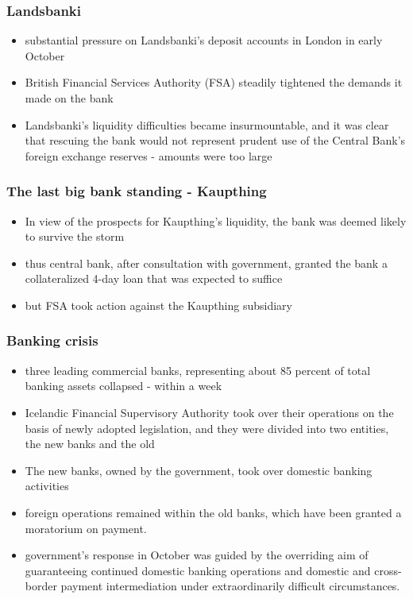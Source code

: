 \documentclass[11pt]{beamer}
\begin{document}
\begin{frame}
\frametitle{Landsbanki}
\begin{itemize}
\item  substantial pressure on Landsbanki’s deposit accounts in
London in early October
\item  British Financial Services Authority (FSA) steadily tightened the demands it made on the bank
\item Landsbanki’s liquidity difficulties became insurmountable, and it was clear that rescuing the bank would not represent prudent use of the Central Bank’s foreign exchange reserves - amounts were too large

\end{itemize}
\end{frame}

\begin{frame}
\frametitle{The last big bank standing - Kaupthing}
\begin{itemize}
\item In view of the prospects for Kaupthing’s liquidity, the bank was deemed likely to survive the storm
\item thus central bank, after consultation with government, granted the bank a collateralized 4-day loan that was expected to suffice
\item but FSA took action against the Kaupthing subsidiary
\end{itemize}
\end{frame}

\begin{frame}
\frametitle{Banking crisis}
\begin{itemize}
\item three leading commercial banks, representing about 85 percent of total banking assets collapsed - within a week
\item Icelandic Financial Supervisory Authority took over their operations on the basis of newly adopted legislation, and they were divided into two entities, the new banks and the old
\item The new banks, owned by the government, took over domestic banking activities
\item foreign operations remained within the old banks, which have been granted a moratorium on payment.
\item government’s response in October was guided by the overriding aim of guaranteeing continued domestic banking operations and domestic and cross-border payment intermediation under extraordinarily difficult circumstances.

\end{itemize}
\end{frame}
\end{document}
